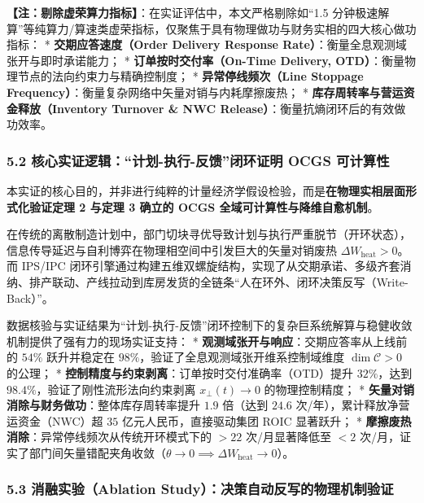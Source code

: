 \documentclass[
]{article}
\begin{document}
\textbf{【注：剔除虚荣算力指标】}：在实证评估中，本文严格剔除如``1.5
分钟极速解算''等纯算力/算速类虚荣指标，仅聚焦于具有物理做功与财务实相的四大核心做功指标：
* \textbf{交期应答速度（Order Delivery Response
Rate）}：衡量全息观测域张开与即时承诺能力； *
\textbf{订单按时交付率（On-Time Delivery,
OTD）}：衡量物理节点的法向约束力与精确控制度； *
\textbf{异常停线频次（Line Stoppage
Frequency）}：衡量复杂网络中矢量对销与内耗摩擦废热； *
\textbf{库存周转率与营运资金释放（Inventory Turnover \& NWC
Release）}：衡量抗熵闭环后的有效做功效率。

\subsubsection{5.2 核心实证逻辑：``计划-执行-反馈''闭环证明 OCGS
可计算性}\label{ux6838ux5fc3ux5b9eux8bc1ux903bux8f91ux8ba1ux5212-ux6267ux884c-ux53cdux9988ux95edux73afux8bc1ux660e-ocgs-ux53efux8ba1ux7b97ux6027}

本实证的核心目的，并非进行纯粹的计量经济学假设检验，而是\textbf{在物理实相层面形式化验证定理
2 与定理 3 确立的 OCGS 全域可计算性与降维自愈机制}。

在传统的离散制造计划中，部门切块寻优导致计划与执行严重脱节（开环状态），信息传导延迟与自利博弈在物理相空间中引发巨大的矢量对销废热
\(\Delta W_{\text{heat}} > 0\)。而 IPS/IPC
闭环引擎通过构建五维双螺旋结构，实现了从交期承诺、多级齐套消纳、排产联动、产线拉动到库房发货的全链条``人在环外、闭环决策反写（Write-Back）''。

数据核验与实证结果为``计划-执行-反馈''闭环控制下的复杂巨系统解算与稳健收敛机制提供了强有力的现场实证支持：
* \textbf{观测域张开与响应}：交期应答率从上线前的 \(54\%\) 跃升并稳定在
\(98\%\)，验证了全息观测域张开维系控制域维度 \(\dim\mathcal{C} > 0\)
的公理； * \textbf{控制精度与约束剥离}：订单按时交付准确率（OTD）提升
\(32\%\)，达到 \(98.4\%\)，验证了刚性流形法向约束剥离
\(x_\bot(t) \to 0\) 的物理控制精度； *
\textbf{矢量对销消除与财务做功}：整体库存周转率提升 \(1.9\) 倍（达到
\(24.6\) 次/年），累计释放净营运资金（NWC）超 \(35\)
亿元人民币，直接驱动集团 ROIC 显著跃升； *
\textbf{摩擦废热消除}：异常停线频次从传统开环模式下的 \(>22\)
次/月显著降低至 \(<2\)
次/月，证实了部门间矢量错配夹角收敛（\(\theta \to 0 \implies \Delta W_{\text{heat}} \to 0\)）。

\subsubsection{5.3 消融实验（Ablation
Study）：决策自动反写的物理机制验证}\label{ux6d88ux878dux5b9eux9a8cablation-studyux51b3ux7b56ux81eaux52a8ux53cdux5199ux7684ux7269ux7406ux673aux5236ux9a8cux8bc1}
\end{document}
